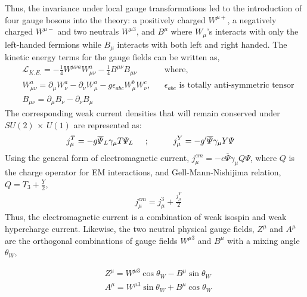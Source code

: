 Thus, the invariance under local gauge transformations led to the introduction of four gauge bosons into the theory: a positively charged $W^{{\mu}+}$,
a negatively charged $W^{{\mu}-}$ and two neutrals $W^{{\mu}3}$, and $B^{\mu}$ where $W_{\mu}$'s interacts with only the left-handed fermions while $B_{\mu}$
interacts with both left and right handed. The kinetic energy terms for the gauge fields can be written as,
\begin{equation}
  \begin{split}
    & \mathcal{L}_{K.E.} = -\frac{1}{4}W^{{\mu\nu}a}W_{\mu\nu}^{a} -\frac{1}{4}B^{\mu\nu}B_{\mu\nu} & & \textrm{where,} \\
    & W^{a}_{\mu\nu} = \partial_{\mu}W_{\nu}^{a} - \partial_{\nu}W_{\mu}^{a} -g\epsilon_{abc}W_{\mu}^{b}W_{\nu}^{c}, & & \epsilon_{abc} \textrm{ is totally anti-symmetric tensor}\\
    & B_{\mu\nu} = \partial_{\mu}B_{\nu} - \partial_{\nu}B_{\mu}
    \label{eg:EWK_Lke}
    \end{split}
\end{equation}
The corresponding weak current densities that will remain conserved under $SU(2)$ $\times$ $U(1)$ are represented as:
\begin{equation}
  \begin{split}
    & j_{\mu}^{T} = -g\overline{\Psi}_{L}\gamma_{\mu}T{\Psi}_{L} \hspace{0.2in} ; \hspace{0.4in} j_{\mu}^{Y} = -g^{\prime}\overline{\Psi}\gamma_{\mu}Y{\Psi}
    \label{eg:EWK_jmu}
  \end{split}
\end{equation}
Using the general form of electromagnetic current, $j_{\mu}^{em} = -e\overline{\Psi}\gamma_{\mu}Q{\Psi}$, where $Q$ is the charge operator for EM
interactions, and Gell-Mann-Nishijima relation, $Q = T_{3} + \frac{Y}{2}$,
\begin{equation}
  \begin{split}
    & j_{\mu}^{em} = j_{\mu}^{3} + \frac{j_{\mu}^{Y}}{2}
    \label{eg:EWK_jmu_all}
  \end{split}
\end{equation}
Thus, the electromagnetic current is a combination of weak isospin and weak hypercharge current. Likewise, the two neutral physical gauge fields,
$Z^{\mu}$ and $A^{\mu}$ are the orthogonal combinations of gauge fields $W^{{\mu}3}$ and $B^{\mu}$ with a mixing angle $\theta_{W}$, \\
\begin{minipage}{0.55\textwidth}
\begin{equation}
  \begin{split}
    & Z^{\mu} = W^{{\mu}3}\cos{\theta}_{W} - B^{\mu} \sin{\theta}_{W} \\
    & A^{\mu} = W^{{\mu}3}\sin{\theta}_{W} + B^{\mu} \cos{\theta}_{W}
    \label{eq:EWK_Zmu_Amu}
\end{split}
\end{equation}
\end{minipage}%
